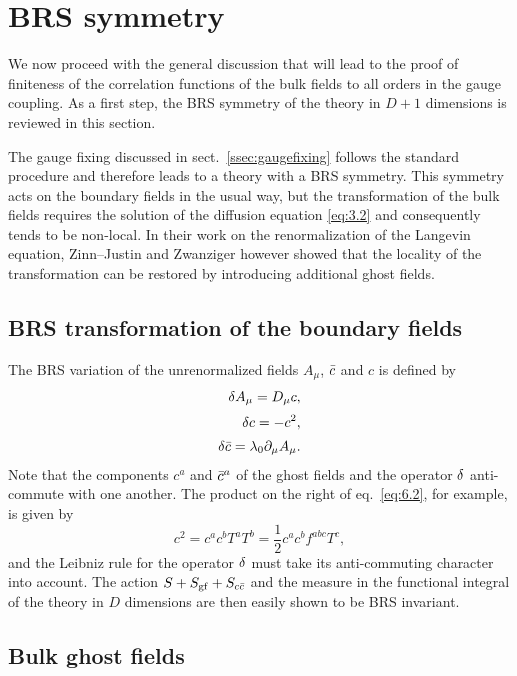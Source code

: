 \section{BRS symmetry}\label{sec:brs}

We now proceed with the general discussion that will lead to
the proof of finiteness of the correlation functions of the bulk
fields to all orders in the gauge coupling.
As a first step,
the BRS symmetry of the theory in $D+1$ dimensions
is reviewed in this section.

The gauge fixing discussed in sect.~\ref{ssec:gaugefixing}
follows the standard procedure and therefore leads to
a theory with a BRS symmetry.
This symmetry acts on the boundary fields in the usual way, but
the transformation of the bulk fields requires the solution of
the diffusion equation \eqref{eq:3.2} and consequently tends to be non-local.
In their work on the renormalization
of the Langevin equation, Zinn--Justin and Zwanziger \cite{ZinnZwanziger}
however showed that the locality of the transformation can be
restored by introducing additional ghost fields.

\subsection{BRS transformation of the boundary fields}

The BRS variation of the unrenormalized
fields $A_{\mu}$, $\bar{c}$ and $c$ is defined by \cite{BRSI,BRSII}
\begin{align}
   \delta A_{\mu}=D_{\mu}c,
   \label{eq:6.1}\\[2pt]
   \delta c=-c^2,
   \label{eq:6.2}\\[2pt]
   \delta\bar{c}=\lambda_0\partial_{\mu}A_{\mu}.
   \label{eq:6.3}
\end{align}
Note that the components $c^a$ and $\bar{c}^a$ of the ghost fields
and the operator $\delta$
anti-commute with one another.
The product on the right of eq.~\eqref{eq:6.2}, for example,
is given by
\begin{equation}
   c^2=c^ac^bT^aT^b=\frac{1}{2}c^ac^bf^{abc}T^c,
   \label{eq:6.4}
\end{equation}
and the Leibniz rule for the operator $\delta$
must take its anti-commuting character
into account.
The action $S+S_{\mathrm{gf}}+S_{c\bar{c}}$
and the measure in the functional integral
of the theory in $D$ dimensions are then
easily shown to be BRS invariant.

\subsection{Bulk ghost fields}

